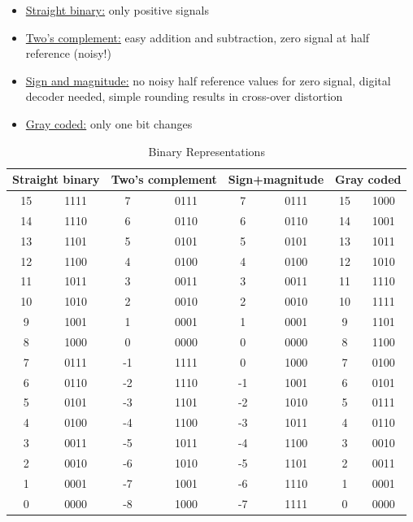 \documentclass{report}
\begin{document}
\begin{itemize}
    \item \underline{Straight binary:} only positive signals
    \item \underline{Two’s complement:} easy addition and subtraction, zero signal at half reference (noisy!)
    \item \underline{Sign and magnitude:} no noisy half reference values for zero signal, digital decoder needed, simple rounding results in cross-over distortion
    \item \underline{Gray coded:} only one bit changes
\end{itemize}

\begin{table}[H]
    \centering
    \begin{tabular}{|c|c|c|c|c|c|c|c|}
        \toprule
        \multicolumn{2}{c|}{\textbf{Straight binary}} & \multicolumn{2}{c|}{\textbf{Two’s complement}} & \multicolumn{2}{c|}{\textbf{Sign+magnitude}} & \multicolumn{2}{c|}{\textbf{Gray coded}} \\
        \midrule
        15 & 1111 & 7  & 0111 & 7  & 0111 & 15 & 1000 \\
        14 & 1110 & 6  & 0110 & 6  & 0110 & 14 & 1001 \\
        13 & 1101 & 5  & 0101 & 5  & 0101 & 13 & 1011 \\
        12 & 1100 & 4  & 0100 & 4  & 0100 & 12 & 1010 \\
        11 & 1011 & 3  & 0011 & 3  & 0011 & 11 & 1110 \\
        10 & 1010 & 2  & 0010 & 2  & 0010 & 10 & 1111 \\
        9  & 1001 & 1  & 0001 & 1  & 0001 & 9  & 1101 \\
        8  & 1000 & 0  & 0000 & 0  & 0000 & 8  & 1100 \\
        7  & 0111 & -1 & 1111 & 0 & 1000 & 7  & 0100 \\
        6  & 0110 & -2 & 1110 & -1 & 1001 & 6  & 0101 \\
        5  & 0101 & -3 & 1101 & -2 & 1010 & 5  & 0111 \\
        4  & 0100 & -4 & 1100 & -3 & 1011 & 4  & 0110 \\
        3  & 0011 & -5 & 1011 & -4 & 1100 & 3  & 0010 \\
        2  & 0010 & -6 & 1010 & -5 & 1101 & 2  & 0011 \\
        1  & 0001 & -7 & 1001 & -6 & 1110 & 1  & 0001 \\
        0  & 0000 & -8 & 1000 & -7 & 1111 & 0  & 0000 \\
        \bottomrule
    \end{tabular}
    \caption{Binary Representations}
    \label{tab:binary}
\end{table}
\end{document}

